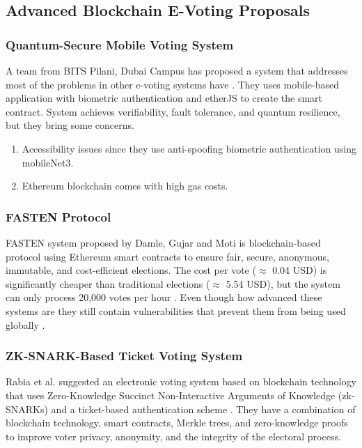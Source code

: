\documentclass[12pt, a4paper]{report}
\begin{document}
\subsection{Advanced Blockchain E-Voting Proposals}

\subsubsection{Quantum-Secure Mobile Voting System}
A team from BITS Pilani, Dubai Campus has proposed a system that addresses most of the problems in other e-voting systems have \cite{poudel2025quantum_blockchain_evoting}. They uses mobile-based application with biometric authentication and etherJS to create the smart contract. System achieves verifiability, fault tolerance, and quantum resilience, but they bring some concerns.

\begin{enumerate}
    \item Accessibility issues since they use anti-spoofing biometric authentication using mobileNet3.
    \item Ethereum blockchain comes with high gas costs.
\end{enumerate}

\subsubsection{FASTEN Protocol}
FASTEN system proposed by Damle, Gujar and Moti is blockchain-based protocol using Ethereum smart contracts to ensure fair, secure, anonymous, immutable, and cost-efficient elections. The cost per vote ($\approx$ 0.04 USD) is significantly cheaper than traditional elections ($\approx$ 5.54 USD), but the system can only process 20,000 votes per hour \cite{damle2021fasten}. Even though how advanced these systems are they still contain vulnerabilities that prevent them from being used globally \cite{vladucu2023evoting}.

\subsubsection{ZK-SNARK-Based Ticket Voting System}

Rabia et al. suggested an electronic voting system based on blockchain technology that uses Zero-Knowledge Succinct Non-Interactive Arguments of Knowledge (zk-SNARKs) and a ticket-based authentication scheme \cite{rabia2024zksnark}. They have a combination of blockchain technology, smart contracts, Merkle trees, and zero-knowledge proofs to improve voter privacy, anonymity, and the integrity of the electoral process.
\end{document}
